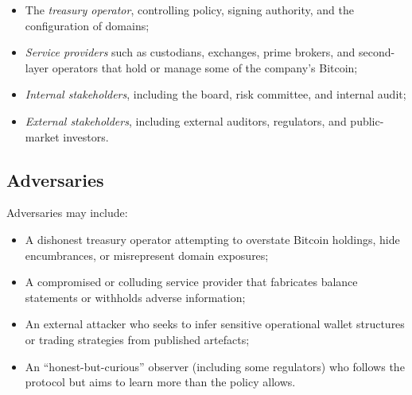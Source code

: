 \documentclass[11pt]{article}
\begin{document}
\begin{itemize}[noitemsep]
\item The \emph{treasury operator}, controlling policy, signing authority, and the configuration of domains;
\item \emph{Service providers} such as custodians, exchanges, prime brokers, and second-layer operators that hold or manage some of the company's Bitcoin;
\item \emph{Internal stakeholders}, including the board, risk committee, and internal audit;
\item \emph{External stakeholders}, including external auditors, regulators, and public-market investors.
\end{itemize}

\subsection{Adversaries}

Adversaries may include:

\begin{itemize}[noitemsep]
\item A dishonest treasury operator attempting to overstate Bitcoin holdings, hide encumbrances, or misrepresent domain exposures;
\item A compromised or colluding service provider that fabricates balance statements or withholds adverse information;
\item An external attacker who seeks to infer sensitive operational wallet structures or trading strategies from published artefacts;
\item An ``honest-but-curious'' observer (including some regulators) who follows the protocol but aims to learn more than the policy allows.
\end{itemize}
\end{document}
